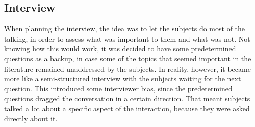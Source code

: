 \subsection{Interview}
When planning the interview, the idea was to let the subjects do most of the talking, in order to assess what was important to them and what was not. Not knowing how this would work, it was decided to have some predetermined questions as a backup, in case some of the topics that seemed important in the literature remained unaddressed by the subjects. In reality, however, it became more like a semi-structured interview with the subjects waiting for the next question. This introduced some interviewer bias, since the predetermined questions dragged the conversation in a certain direction. That meant subjects talked a lot about a specific aspect of the interaction, because they were asked directly about it.
